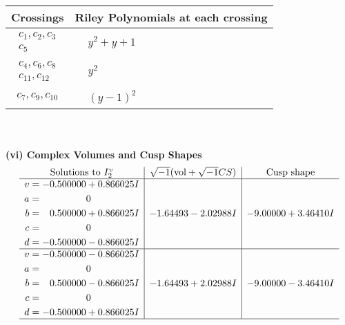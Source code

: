 \documentclass[1p]{elsarticle_modified}
\theoremstyle{definition}
\newcommand{\I}{\sqrt{-1}}
\begin{document}
\begin{tabular}{m{50pt}|m{274pt}}
Crossings & \hspace{64pt}Riley Polynomials at each crossing \\
\hline $$\begin{aligned}c_{1},c_{2},c_{3}\\c_{5}\end{aligned}$$&$\begin{aligned}
&y^2+y+1
\end{aligned}$\\
\hline $$\begin{aligned}c_{4},c_{6},c_{8}\\c_{11},c_{12}\end{aligned}$$&$\begin{aligned}
&y^2
\end{aligned}$\\
\hline $$\begin{aligned}c_{7},c_{9},c_{10}\end{aligned}$$&$\begin{aligned}
&(y-1)^2
\end{aligned}$\\
\hline
\end{tabular}\\~\\
\newpage\flushleft \textbf{(vi) Complex Volumes and Cusp Shapes}
$$\begin{array}{c|c|c}  
\text{Solutions to }I^v_{2}& \I (\text{vol} + \sqrt{-1}CS) & \text{Cusp shape}\\
 \hline 
\begin{aligned}
v &= -0.500000 + 0.866025 I \\
a &= \phantom{-0.000000 } 0 \\
b &= \phantom{-}0.500000 + 0.866025 I \\
c &= \phantom{-0.000000 } 0 \\
d &= -0.500000 - 0.866025 I\end{aligned}
 & -1.64493 - 2.02988 I & -9.00000 + 3.46410 I \\ \hline\begin{aligned}
v &= -0.500000 - 0.866025 I \\
a &= \phantom{-0.000000 } 0 \\
b &= \phantom{-}0.500000 - 0.866025 I \\
c &= \phantom{-0.000000 } 0 \\
d &= -0.500000 + 0.866025 I\end{aligned}
 & -1.64493 + 2.02988 I & -9.00000 - 3.46410 I\\
 \hline 
 \end{array}$$\newpage\newpage\renewcommand{\arraystretch}{1}
\end{document}
